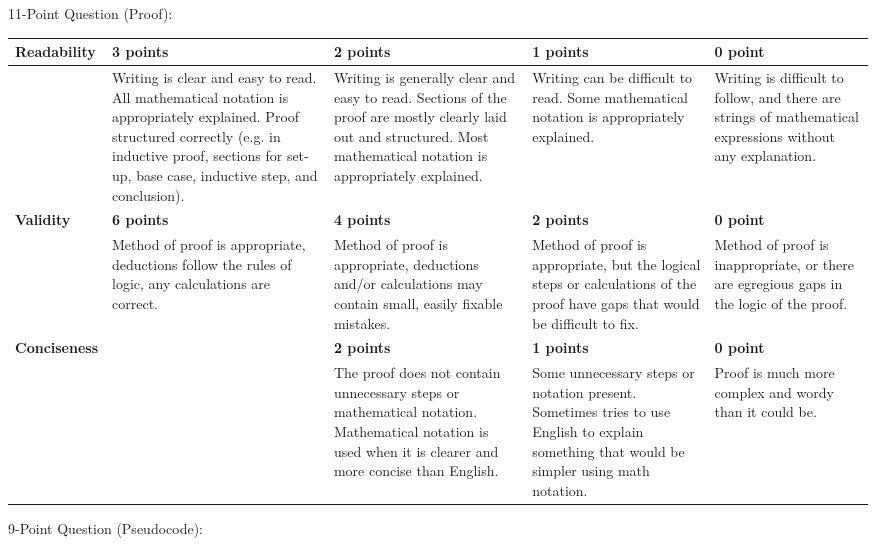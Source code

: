 \documentclass[12pt,landscape]{article}
\begin{document}
{\large 11-Point Question (Proof):}


{\renewcommand{\arraystretch}{2}
\begin{tabular}{|p{2.3cm}|p{4.2cm}|p{4.2cm}|p{4.2cm}|p{4.2cm}|}
\hline
{\bf Readability } & {\bf 3 points} & {\bf 2 points} & {\bf 1 points} & {\bf 0 point} \\
\hline
& 
 Writing is clear and easy to read. All mathematical notation is appropriately explained. Proof structured correctly (e.g. in inductive proof, sections for set-up, base case, inductive step, and conclusion). & 
 Writing is generally clear and easy to read. Sections of the proof are mostly clearly laid out and structured. Most mathematical notation is appropriately explained.& 
 Writing can be difficult to read. Some mathematical notation is appropriately explained. & 
 Writing is difficult to follow, and there are strings of mathematical expressions without any explanation.\\
\hline
{\bf Validity } & {\bf 6 points} & {\bf 4 points} & {\bf 2 points} & {\bf 0 point} \\
\hline
& 
Method of proof is appropriate, deductions follow the rules of logic, any calculations are correct. & 
Method of proof is appropriate, deductions and/or calculations may contain small, easily fixable mistakes. & 
Method of proof is appropriate, but the logical steps or calculations of the proof have gaps that would be difficult to fix. & 
Method of proof is inappropriate, or there are egregious gaps in the logic of the proof.\\
\hline
{\bf Conciseness} & & {\bf 2 points} & {\bf 1 points} & {\bf 0 point} \\
\hline
 &

&
The proof does not contain unnecessary steps or mathematical notation. Mathematical notation is used when it is clearer and more concise than English.
&
Some unnecessary steps or notation present. Sometimes tries to use English to explain something that would be simpler using math notation.
&
Proof is much more complex and wordy than it could be.\\
\hline
 \end{tabular}
}




\newpage

{\large 9-Point Question (Pseudocode):}
\end{document}
